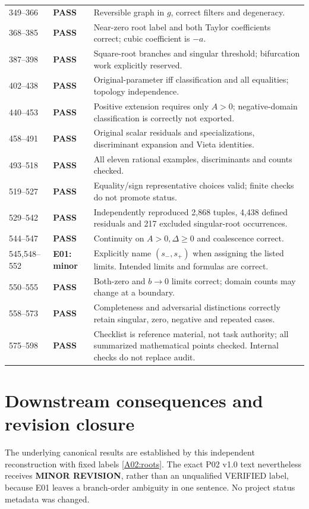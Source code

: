 \documentclass[11pt]{article}
\newcommand{\pass}{\textbf{PASS}}
\begin{document}
\begin{longtable}{@{}P{0.14\textwidth}P{0.16\textwidth}P{0.62\textwidth}@{}}
349--366 & \pass & Reversible graph in \(g\), correct filters and degeneracy.\\
368--385 & \pass & Near-zero root label and both Taylor coefficients correct;
cubic coefficient is \(-a\).\\
387--398 & \pass & Square-root branches and singular threshold; bifurcation
work explicitly reserved.\\
402--438 & \pass & Original-parameter iff classification and all equalities;
topology independence.\\
440--453 & \pass & Positive extension requires only \(A>0\); negative-domain
classification is correctly not exported.\\
458--491 & \pass & Original scalar residuals and specializations,
discriminant expansion and Vieta identities.\\
493--518 & \pass & All eleven rational examples, discriminants and counts checked.\\
519--527 & \pass & Equality/sign representative choices valid;
finite checks do not promote status.\\
529--542 & \pass & Independently reproduced 2,868 tuples, 4,438 defined
residuals and 217 excluded singular-root occurrences.\\
544--547 & \pass & Continuity on \(A>0,\Delta\ge0\) and coalescence correct.\\
545,548--552 & \textbf{E01: minor} & Explicitly name \((s_-,s_+)\)
when assigning the listed limits. Intended limits and formulas are correct.\\
550--555 & \pass & Both-zero and \(b\to0\) limits correct;
domain counts may change at a boundary.\\
558--573 & \pass & Completeness and adversarial distinctions correctly retain
singular, zero, negative and repeated cases.\\
575--598 & \pass & Checklist is reference material, not task authority;
all summarized mathematical points checked. Internal checks do not replace audit.\\
\bottomrule
\end{longtable}

\clearpage
\section{Downstream consequences and revision closure}

The underlying canonical results are established by this independent
reconstruction with fixed labels \eqref{A02:roots}. The exact P02 v1.0
text nevertheless receives \textbf{MINOR REVISION}, rather than an
unqualified VERIFIED label, because E01 leaves a branch-order ambiguity
in one sentence. No project status metadata was changed.
\end{document}
